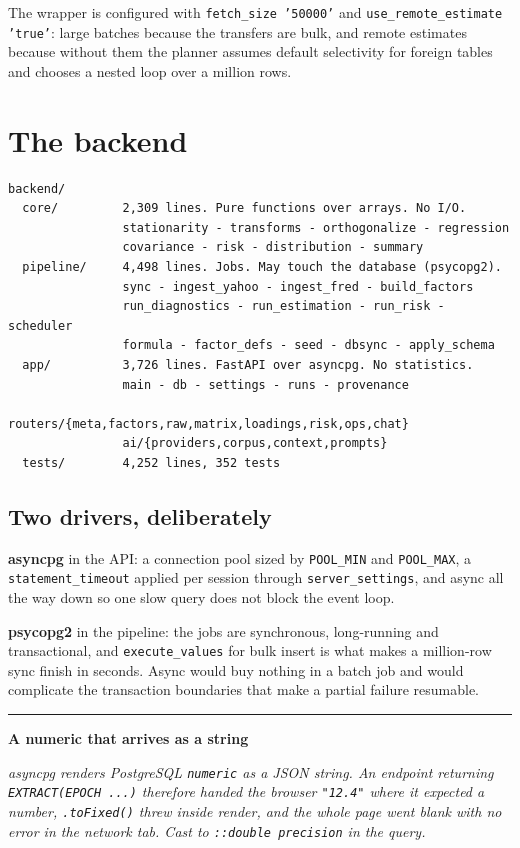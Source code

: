 \documentclass[11pt,a4paper]{article}
\newcommand{\code}[1]{\texttt{\small #1}}
\newenvironment{designnote}[1]
  {\par\vspace{1.6ex}%
   \begin{lrbox}{\notebox}\begin{minipage}{\textwidth}%
   {\color{rule}\rule{\textwidth}{0.4pt}}\par\vspace{0.7ex}
   {\small\sffamily\bfseries\color{navy}#1}\par\vspace{0.35ex}
   \small\itshape}
  {\par\vspace{0.7ex}\noindent{\color{rule}\rule{\textwidth}{0.4pt}}%
   \end{minipage}\end{lrbox}%
   \noindent\usebox{\notebox}\par\vspace{1.6ex}}
\begin{document}
The wrapper is configured with \code{fetch\_size '50000'} and
\code{use\_remote\_estimate 'true'}: large batches because the transfers are bulk,
and remote estimates because without them the planner assumes default selectivity
for foreign tables and chooses a nested loop over a million rows.

\section{The backend}

\begin{lstlisting}
backend/
  core/         2,309 lines. Pure functions over arrays. No I/O.
                stationarity - transforms - orthogonalize - regression
                covariance - risk - distribution - summary
  pipeline/     4,498 lines. Jobs. May touch the database (psycopg2).
                sync - ingest_yahoo - ingest_fred - build_factors
                run_diagnostics - run_estimation - run_risk - scheduler
                formula - factor_defs - seed - dbsync - apply_schema
  app/          3,726 lines. FastAPI over asyncpg. No statistics.
                main - db - settings - runs - provenance
                routers/{meta,factors,raw,matrix,loadings,risk,ops,chat}
                ai/{providers,corpus,context,prompts}
  tests/        4,252 lines, 352 tests
\end{lstlisting}

\subsection{Two drivers, deliberately}

\textbf{asyncpg} in the API: a connection pool sized by \code{POOL\_MIN} and
\code{POOL\_MAX}, a \code{statement\_timeout} applied per session through
\code{server\_settings}, and async all the way down so one slow query does not
block the event loop.

\textbf{psycopg2} in the pipeline: the jobs are synchronous, long-running and
transactional, and \code{execute\_values} for bulk insert is what makes a
million-row sync finish in seconds. Async would buy nothing in a batch job and
would complicate the transaction boundaries that make a partial failure resumable.

\begin{designnote}{A numeric that arrives as a string}
asyncpg renders PostgreSQL \code{numeric} as a JSON string. An endpoint returning
\code{EXTRACT(EPOCH ...)} therefore handed the browser \code{"12.4"} where it
expected a number, \code{.toFixed()} threw inside render, and the whole page went
blank with no error in the network tab. Cast to \code{::double precision} in the
query.
\end{designnote}
\end{document}
